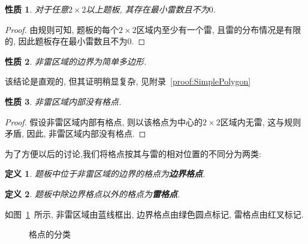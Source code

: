 \documentclass{ctexart}
\newcommand{\varible}[1]{{\Noto[#1]}}
\newcommand{\redcross}[2]{
    \begin{scope}[thick,color = red,shift={(#1,#2)}]
        \draw (0.05,-0.05) -- (-0.05,0.05);
        \draw (-0.05,-0.05) -- (0.05,0.05);
    \end{scope}
}
\newcommand{\greenlinedot}[4]{
    \draw[color = cyan,line width = 1.5] (#1,#2) -- (#3,#4);
    \draw[fill, color = green] (#1,#2) circle (0.03);
    \draw[fill, color = green] (#3,#4) circle (0.03);
    }
\newtheorem{property}{性质}
\newtheorem{definition}{定义}
\begin{document}
\begin{property}
    对于任意$2\times2$以上题板, 其存在最小雷数且不为$0$.
\end{property}
\begin{proof}
    由\varible{Q}规则可知, 题板的每个$2\times2$区域内至少有一个雷, 且雷的分布情况是有限的, 因此题板存在最小雷数且不为$0$.
\end{proof}
\begin{property}
    \label{p2}
    非雷区域的边界为简单多边形.
\end{property}
该结论是直观的, 但其证明稍显复杂, 见附录\ \ref{proof:SimplePolygon}
\begin{property}
    \label{p3}
    非雷区域内部没有格点.
\end{property}
\begin{proof}
    假设非雷区域内部有格点, 则以该格点为中心的$2\times2$区域内无雷, 这与\varible{Q}规则矛盾, 因此, 非雷区域内部没有格点.
\end{proof}
为了方便以后的讨论,我们将格点按其与雷的相对位置的不同分为两类: 
\begin{definition}
    题板中位于非雷区域的边界的格点为\textbf{边界格点}.
\end{definition}
\begin{definition}
    题板中除边界格点以外的格点为\textbf{雷格点}.
\end{definition}
如图\ \ref{gridpoint}\ 所示, 非雷区域由蓝线框出, 边界格点由绿色圆点标记, 雷格点由红叉标记.
\begin{figure}[ht]
    \centering
    \caption{格点的分类}
    \label{gridpoint}
\end{figure}
\end{document}
